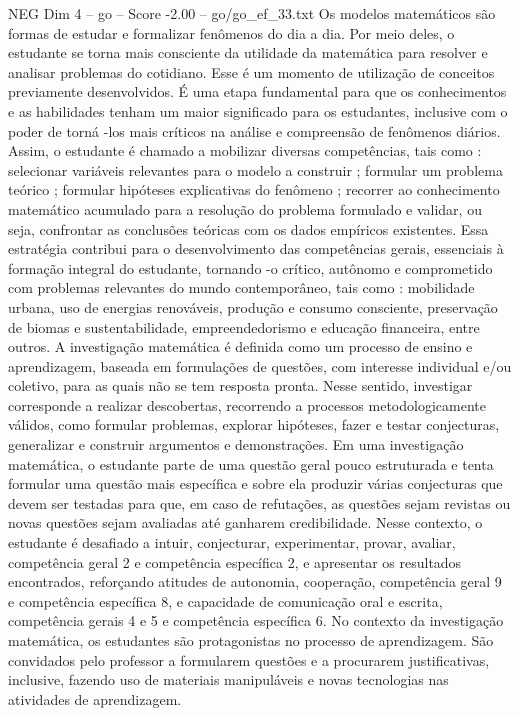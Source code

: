 \begin{textsample}{NEG Dim 4 – go – Score -2.00 – go/go\_ef\_33.txt}
Os modelos matemáticos são formas de estudar e formalizar fenômenos do dia a dia.
Por meio deles, o estudante se torna mais consciente da utilidade da matemática para resolver e analisar problemas do cotidiano.
Esse é um momento de utilização de conceitos previamente desenvolvidos.
É uma etapa fundamental para que os conhecimentos e as habilidades tenham um maior significado para os estudantes, inclusive com o poder de torná -los mais críticos na análise e compreensão de fenômenos diários.
Assim, o estudante é chamado a mobilizar diversas competências, tais como : selecionar variáveis relevantes para o modelo a construir ; formular um problema teórico ; formular hipóteses explicativas do fenômeno ; recorrer ao conhecimento matemático acumulado para a resolução do problema formulado e validar, ou seja, confrontar as conclusões teóricas com os dados empíricos existentes.
Essa estratégia contribui para o desenvolvimento das competências gerais, essenciais à formação integral do estudante, tornando -o crítico, autônomo e comprometido com problemas relevantes do mundo contemporâneo, tais como : mobilidade urbana, uso de energias renováveis, produção e consumo consciente, preservação de biomas e sustentabilidade, empreendedorismo e educação financeira, entre outros.
A investigação matemática é definida como um processo de ensino e aprendizagem, baseada em formulações de questões, com interesse individual e/ou coletivo, para as quais não se tem resposta pronta.
Nesse sentido, investigar corresponde a realizar descobertas, recorrendo a processos metodologicamente válidos, como formular problemas, explorar hipóteses, fazer e testar conjecturas, generalizar e construir argumentos e demonstrações.
Em uma investigação matemática, o estudante parte de uma questão geral pouco estruturada e tenta formular uma questão mais específica e sobre ela produzir várias conjecturas que devem ser testadas para que, em caso de refutações, as questões sejam revistas ou novas questões sejam avaliadas até ganharem credibilidade.
Nesse contexto, o estudante é desafiado a intuir, conjecturar, experimentar, provar, avaliar, competência geral 2 e competência específica 2, e apresentar os resultados encontrados, reforçando atitudes de autonomia, cooperação, competência geral 9 e competência específica 8, e capacidade de comunicação oral e escrita, competência gerais 4 e 5 e competência específica 6.
No contexto da investigação matemática, os estudantes são protagonistas no processo de aprendizagem.
São convidados pelo professor a formularem questões e a procurarem justificativas, inclusive, fazendo uso de materiais manipuláveis e novas tecnologias nas atividades de aprendizagem.

\end{textsample}
